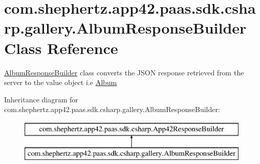 \hypertarget{classcom_1_1shephertz_1_1app42_1_1paas_1_1sdk_1_1csharp_1_1gallery_1_1_album_response_builder}{\section{com.\+shephertz.\+app42.\+paas.\+sdk.\+csharp.\+gallery.\+Album\+Response\+Builder Class Reference}
\label{classcom_1_1shephertz_1_1app42_1_1paas_1_1sdk_1_1csharp_1_1gallery_1_1_album_response_builder}
}


\hyperlink{classcom_1_1shephertz_1_1app42_1_1paas_1_1sdk_1_1csharp_1_1gallery_1_1_album_response_builder}{Album\+Response\+Builder} class converts the J\+S\+O\+N response retrieved from the server to the value object i.\+e \hyperlink{classcom_1_1shephertz_1_1app42_1_1paas_1_1sdk_1_1csharp_1_1gallery_1_1_album}{Album}  


Inheritance diagram for com.\+shephertz.\+app42.\+paas.\+sdk.\+csharp.\+gallery.\+Album\+Response\+Builder\+:\begin{figure}[H]
\begin{center}
\leavevmode
\includegraphics[height=2.000000cm]{classcom_1_1shephertz_1_1app42_1_1paas_1_1sdk_1_1csharp_1_1gallery_1_1_album_response_builder}
\end{center}
\end{figure}
